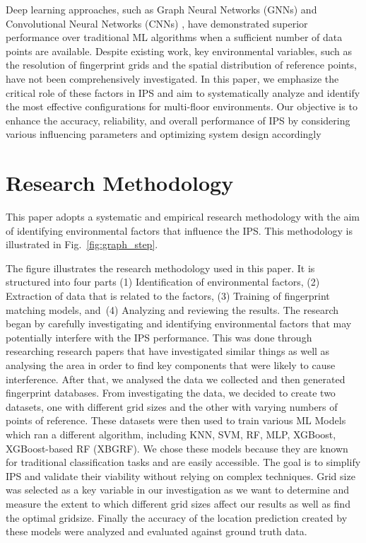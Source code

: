 \documentclass[conference]{IEEEtran}
\begin{document}
	Deep learning approaches, such as Graph Neural Networks (GNNs) \cite{LRE2} and Convolutional Neural Networks (CNNs) \cite{LRE4}, have demonstrated superior performance over traditional ML algorithms when a sufficient number of data points are available. Despite existing work, key environmental variables, such as the resolution of fingerprint grids and the spatial distribution of reference points, have not been comprehensively investigated. In this paper, we emphasize the critical role of these factors in IPS and aim to systematically analyze and identify the most effective configurations for multi-floor environments. Our objective is to enhance the accuracy, reliability, and overall performance of IPS by considering various influencing parameters and optimizing system design accordingly
	
	
	
	\section{Research Methodology}
	This paper adopts a systematic and empirical research methodology with the aim of identifying environmental factors that influence the IPS. This methodology is illustrated in Fig.~\ref{fig:graph_step}.
	
	The figure illustrates the research methodology used in this paper. It is structured into four parts (1) Identification of environmental factors, (2) Extraction of data that is related to the factors, (3) Training of fingerprint matching models, and~(4) Analyzing and reviewing the results. The research began by carefully investigating and identifying environmental factors that may potentially interfere with the IPS performance. This was done through researching research papers that have investigated similar things as well as analysing the area in order to find key components that were likely to cause interference. After that, we analysed the data we collected and then generated fingerprint databases. From investigating the data, we decided to create two datasets, one with different grid sizes and the other with varying numbers of points of reference. These datasets were then used to train various ML Models which ran a different algorithm, including KNN, SVM, RF, MLP, XGBoost, XGBoost-based RF (XBGRF). We chose these models because they are known for traditional classification tasks and are easily accessible. The goal is to simplify IPS and validate their viability without relying on complex techniques. Grid size was selected as a key variable in our investigation as we want to determine and measure the extent to which different grid sizes affect our results as well as find the optimal gridsize. Finally the accuracy of the location prediction created by these models were analyzed and evaluated against ground truth data.
	
\end{document}
